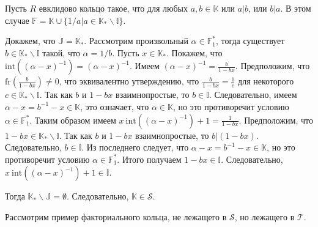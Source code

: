 \documentclass[_00_autoref.tex]{subfiles}
\begin{document}
\begin{example}\label{example:a|b or b|a}
    Пусть $R$ евклидово кольцо такое, что для любых $a,b\in\mathbb{K}$ или $a|b$, или $b|a$.
    В этом случае $\mathbb{F}=\mathbb{K}\cup\{1/a|a\in\mathbb{K}_{*}\backslash\mathbb{I}\}$.

    Докажем, что $\mathbb{J}=\mathbb{K}_{*}$.
    Рассмотрим произвольный $\alpha\in\mathbb{F}_{1}^{*}$, тогда существует $b\in\mathbb{K}_{*}\backslash\mathbb{I}$ такой, что $\alpha=1/b$.
    Пусть $x\in\mathbb{K}_{*}$.
    Покажем, что $\textrm{int}((\alpha-x)^{-1}) = (\alpha-x)^{-1}$.
    Имеем $(\alpha-x)^{-1}=\frac{b}{1-bx}$.
    Предположим, что $\textrm{fr}(\frac{b}{1-bx}) \neq 0$, что эквивалентно утверждению, что $\frac{b}{1 - b x} = \frac{1}{c}$ для некоторого $c\in\mathbb{K}_{*}\backslash\mathbb{I}$.
    Так как $b$ и $1 - b x$ взаимнопростые, то $b\in\mathbb{I}$.
    Следовательно, имеем $\alpha-x=b^{-1}-x\in\mathbb{K}$, это означает, что $\alpha\in\mathbb{K}$, но это противоречит условию $\alpha \in \mathbb{F}_{1}^{*}$.
    Таким образом имеем $x\ \textrm{int}((\alpha-x)^{-1})+1=\frac{1}{1-bx}$.
    Предположим, что $1 - b x \in \mathbb{K}_{*}\backslash\mathbb{I}$.
    Так как $b$ и $1-bx$ взаимнопростые, то $b|(1-bx)$.
    Следовательно, $b\in\mathbb{I}$.
    Из последнего следует, что $\alpha-x=b^{-1}-x\in\mathbb{K}$, но это противоречит условию $\alpha\in\mathbb{F}_{1}^{*}$.
    Итого получаем $1-bx\in\mathbb{I}$.
    Следовательно, $x\ \textrm{int}((\alpha-x)^{-1}) + 1 \in \mathbb{I}$.
    
    Тогда $\mathbb{K}_{*}\backslash\mathbb{J} = \emptyset$.
    Следовательно, $\mathbb{K}\in \mathcal{S}$.
\end{example}

Рассмотрим пример факториального кольца, не лежащего в $\mathcal{S}$, но лежащего в $\mathcal{T}$.
\end{document}
